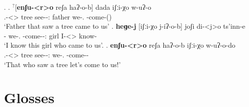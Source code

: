 \ex.  
	\ag. $^?$[\textbf{enʃu-<r>o} reʃa haʔ-o-b] dada iʃːi-χo w-uʔ-o\\
		{\Rfl.\Obl-<\Nans>\Aff} tree {see-\Pst-\Ptcp:\Pst} father {we-\Add.\Lat} {\M-come-\Pst(\Aor)}\\
		\glt `Father that saw a tree came to us' \label{rfl-resumptive}
	\bg. \textbf{heɡe-j} [iʃːi-χo j-iʔ-o-b] joʃi di-<j>o ts'inn-e\\
		{\Dem-\F} {we-\Add.\Lat} {\M-come-\Pst-\Ptcp:\Pst} girl {I-<\F>\Aff} {know-\Hab}\\
		\glt `I know this girl who came to us'. \label{dem-resumptive}
	\bg. \textbf{enʃu-<r>o} reʃa haʔ-o-b iʃːi-χo w-uʔ-o-do\\
		{\Rfl.\Obl-<\Nans>\Aff} tree {see-\Pst-\Ptcp:\Pst} {we-\Add.\Lat} {\M-come-\Imp-\Jus}\\
		\glt `That who saw a tree let's come to us!' \label{resumptive?}
 
\section*{Glosses}
\small
\printglosses


\normalsize
